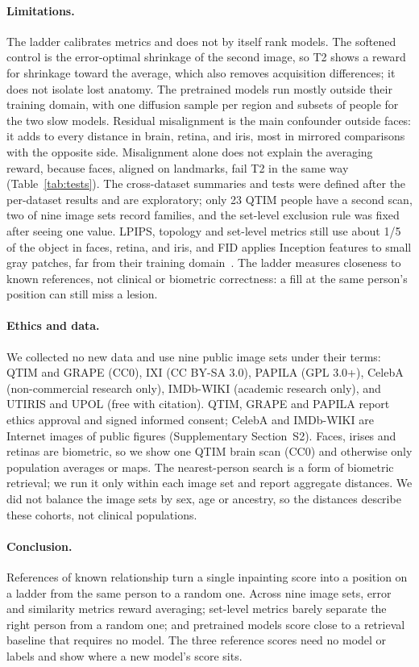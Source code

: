 \paragraph{Limitations.}
The ladder calibrates metrics and does not by itself rank models.
The softened control is the error-optimal shrinkage of the second image, so T2 shows a reward for shrinkage toward the average, which also removes acquisition differences; it does not isolate lost anatomy.
The pretrained models run mostly outside their training domain, with one diffusion sample per region and subsets of people for the two slow models.
Residual misalignment is the main confounder outside faces: it adds to every distance in brain, retina, and iris, most in mirrored comparisons with the opposite side.
Misalignment alone does not explain the averaging reward, because faces, aligned on landmarks, fail T2 in the same way (Table~\ref{tab:tests}).
The cross-dataset summaries and tests were defined after the per-dataset results and are exploratory; only 23 QTIM people have a second scan, two of nine image sets record families, and the set-level exclusion rule was fixed after seeing one value.
\ac{LPIPS}, topology and set-level metrics still use about 1/5 of the object in faces, retina, and iris, and \ac{FID} applies Inception features to small gray patches, far from their training domain~\cite{kynkaanniemi2023fid}.
The ladder measures closeness to known references, not clinical or biometric correctness: a fill at the same person's position can still miss a lesion.

\paragraph{Ethics and data.}
We collected no new data and use nine public image sets under their terms: QTIM and GRAPE (CC0), IXI (CC BY-SA 3.0), PAPILA (GPL 3.0+), CelebA (non-commercial research only), IMDb-WIKI (academic research only), and UTIRIS and UPOL (free with citation).
QTIM, GRAPE and PAPILA report ethics approval and signed informed consent; CelebA and IMDb-WIKI are Internet images of public figures (Supplementary Section~S2).
Faces, irises and retinas are biometric, so we show one QTIM brain scan (CC0) and otherwise only population averages or maps.
The nearest-person search is a form of biometric retrieval; we run it only within each image set and report aggregate distances.
We did not balance the image sets by sex, age or ancestry, so the distances describe these cohorts, not clinical populations.

\paragraph{Conclusion.}
References of known relationship turn a single inpainting score into a position on a ladder from the same person to a random one.
Across nine image sets, error and similarity metrics reward averaging; set-level metrics barely separate the right person from a random one; and pretrained models score close to a retrieval baseline that requires no model.
The three reference scores need no model or labels and show where a new model's score sits.

